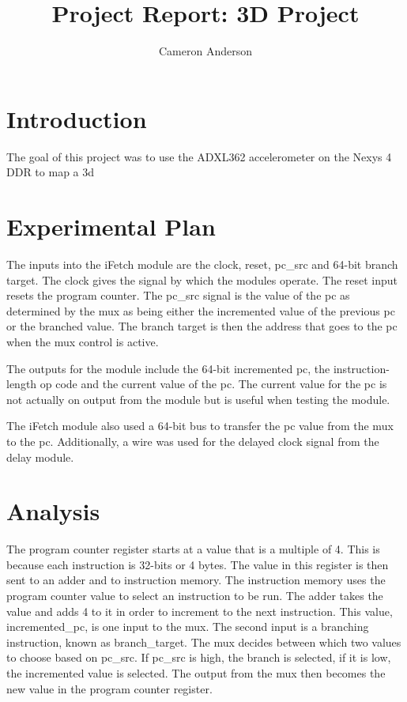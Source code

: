 \documentclass{article}
\author{Cameron Anderson}
\title{Project Report: 3D Project}
\begin{document}
\maketitle

\section{Introduction}
The goal of this project was to use the ADXL362 accelerometer on the Nexys 4 DDR to map a 3d

\section{Experimental Plan}
The inputs into the iFetch module are the clock, reset, pc\_src and 64-bit branch target. The clock gives the signal by which the modules operate. The reset input resets the program counter. The pc\_src signal is the value of the pc as determined by the mux as being either the incremented value of the previous pc or the branched value.  The branch target is then the address that goes to the pc when the mux control is active.
     
The outputs for the module include the 64-bit incremented pc, the instruction-length op code and the current value of the pc. The current value for the pc is not actually on output from the module but is useful when testing the module. 

The iFetch module also used a 64-bit bus to transfer the pc value from the mux to the pc. Additionally, a wire was used for the delayed clock signal from the delay module.

\section{Analysis}
The program counter register starts at a value that is a multiple of 4. This is because each instruction is 32-bits or 4 bytes. The value in this register is then sent to an adder and to instruction memory. The instruction memory uses the program counter value to select an instruction to be run. The adder takes the value and adds 4 to it in order to increment to the next instruction. This value, incremented\_pc, is one input to the mux. The second input is a branching instruction, known as branch\_target. The mux decides between which two values to choose based on pc\_src. If pc\_src is high, the branch is selected, if it is low, the incremented value is selected. The output from the mux then becomes the new value in the program counter register. 
\end{document}
